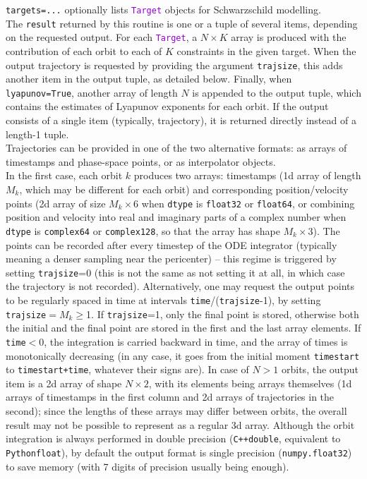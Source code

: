 \documentclass[12pt]{article}
\newcommand{\Cpp}  {\texttt{C++}\xspace}
\newcommand{\Python}{\texttt{Python}\xspace}
\newcommand{\ttt}[1]{\textcolor{darkviolet}{\texttt{#1}}}
\newcommand{\ppp}[1]{\textcolor{darkolive} {\texttt{#1}}}
\begin{document}
\ppp{targets=...} optionally lists \ttt{Target} objects for Schwarzschild modelling. \\[2mm]
The \texttt{result} returned by this routine is one or a tuple of several items, depending on the requested output. For each \ttt{Target}, a $N\times K$ array is produced with the contribution of each orbit to each of $K$ constraints in the given target. When the output trajectory is requested by providing the argument \ppp{trajsize}, this adds another item in the output tuple, as detailed below. Finally, when \texttt{lyapunov=True}, another array of length $N$ is appended to the output tuple, which contains the estimates of Lyapunov exponents for each orbit. If the output consists of a single item (typically, trajectory), it is returned directly instead of a length-1 tuple.\\
Trajectories can be provided in one of the two alternative formats: as arrays of timestamps and phase-space points, or as interpolator objects.\\
In the first case, each orbit $k$ produces two arrays: timestamps (1d array of length $M_k$, which may be different for each orbit) and corresponding position/velocity points (2d array of size $M_k \times 6$ when \ppp{dtype} is \texttt{float32} or \texttt{float64}, or combining position and velocity into real and imaginary parts of a complex number when \ppp{dtype} is \texttt{complex64} or \texttt{complex128}, so that the array has shape $M_k \times 3$). The points can be recorded after every timestep of the ODE integrator (typically meaning a denser sampling near the pericenter) -- this regime is triggered by setting \ppp{trajsize}=0 (this is not the same as not setting it at all, in which case the trajectory is not recorded). Alternatively, one may request the output points to be regularly spaced in time at intervals \texttt{time}/(\texttt{trajsize}-1), by setting \ppp{trajsize}${}=M_k\ge$1. If \ppp{trajsize}=1, only the final point is stored, otherwise both the initial and the final point are stored in the first and the last array elements. If \ppp{time}$<0$, the integration is carried backward in time, and the array of times is monotonically decreasing (in any case, it goes from the initial moment \ppp{timestart} to \ppp{timestart+time}, whatever their signs are).
In case of $N>1$ orbits, the output item is a 2d array of shape $N\times 2$, with its elements being arrays themselves (1d arrays of timestamps in the first column and 2d arrays of trajectories in the second); since the lengths of these arrays may differ between orbits, the overall result may not be possible to represent as a regular 3d array. Although the orbit integration is always performed in double precision (\Cpp \texttt{double}, equivalent to \Python \texttt{float}), by default the output format is single precision (\texttt{numpy.float32}) to save memory (with 7 digits of precision usually being enough).\\
\end{document}
